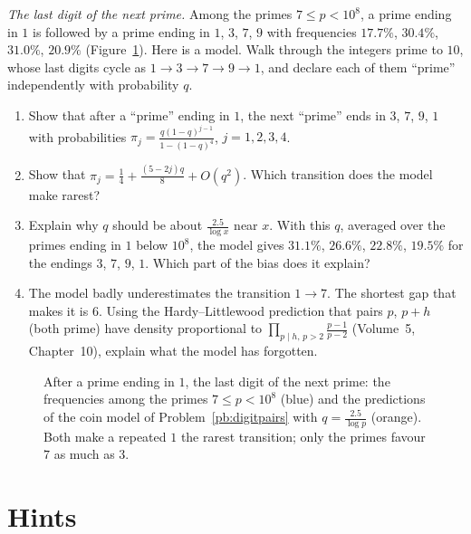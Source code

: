 \begin{exercise}[$\star\star$]\label{pb:digitpairs}
\emph{The last digit of the next prime.} Among the primes $7\le p<10^8$, a prime ending in $1$ is followed by a prime ending in $1$, $3$, $7$, $9$ with frequencies
$17.7\%$, $30.4\%$, $31.0\%$, $20.9\%$ (Figure~\ref{fig:digits}). Here is a model. Walk through the integers prime to $10$, whose last digits cycle as
$1\to3\to7\to9\to1$, and declare each of them ``prime'' independently with probability $q$.
\begin{enumerate}[label=(\alph*)]
\item Show that after a ``prime'' ending in $1$, the next ``prime'' ends in $3$, $7$, $9$, $1$ with probabilities $\pi_j=\frac{q(1-q)^{j-1}}{1-(1-q)^4}$, $j=1,2,3,4$.
\item Show that $\pi_j=\frac14+\frac{(5-2j)q}8+O(q^2)$. Which transition does the model make rarest?
\item Explain why $q$ should be about $\frac{2.5}{\log x}$ near $x$. With this $q$, averaged over the primes ending in $1$ below $10^8$, the model gives $31.1\%$, $26.6\%$, $22.8\%$, $19.5\%$
for the endings $3$, $7$, $9$, $1$. Which part of the bias does it explain?
\item The model badly underestimates the transition $1\to7$. The shortest gap that makes it is $6$. Using the Hardy--Littlewood prediction that pairs $p$, $p+h$ (both prime) have
density proportional to $\prod_{p\mid h,\,p>2}\frac{p-1}{p-2}$ (Volume~5, Chapter~10), explain what the model has forgotten.
\end{enumerate}
\end{exercise}

\begin{figure}[ht]
\centering
{}
\caption{After a prime ending in $1$, the last digit of the next prime: the frequencies among the primes $7\le p<10^8$ (blue) and the predictions of the coin model of
Problem~\ref{pb:digitpairs} with $q=\frac{2.5}{\log p}$ (orange). Both make a repeated $1$ the rarest transition; only the primes favour $7$ as much as $3$.}
\label{fig:digits}
\end{figure}

\section{Hints}

